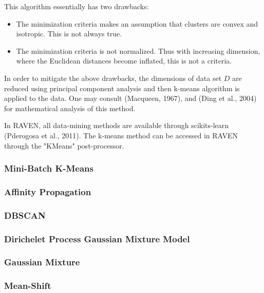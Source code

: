 \documentclass[11pt]{article}
\begin{document}
This algorithm essentially has two drawbacks:

\begin{itemize}
\item The minimization criteria makes an assumption that clusters are convex and isotropic. This is not always true.
\item The minimization criteria is not normalized. Thus with increasing dimension, where the Euclidean distances become inflated, this is not a criteria. 
\end{itemize}

In order to mitigate the above drawbacks, the dimensions of data set $D$ are reduced using principal component analysis and then k-means algorithm is applied to the data. One may consult (Macqueen, 1967), and (Ding et al., 2004) for mathematical analysis of this method. 

In RAVEN, all data-mining methods are available through scikits-learn (Pderogosa et al., 2011). The k-means method can be accessed in RAVEN through the "KMeans" post-processor. 


\subsubsection{Mini-Batch K-Means}

\subsubsection{Affinity Propagation}



\subsubsection{DBSCAN}

\subsubsection{Dirichelet Process Gaussian Mixture Model}

\subsubsection{Gaussian Mixture}



\subsubsection{Mean-Shift} 
\end{document}
